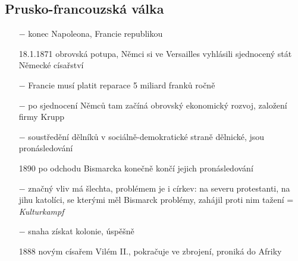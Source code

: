 \documentclass{article}
\begin{document}
\subsection*{Prusko-francouzská válka}
\begin{itemize}
    \vspace{-0.5em}
    \setlength\itemsep{0.15em}
    \item[$-$] konec Napoleona, Francie republikou
    \item[18.1.1871] obrovská potupa, Němci si ve Versailles vyhlásili sjednocený stát Německé císařství
    \item[$-$] Francie musí platit reparace 5 miliard franků ročně
\end{itemize}

\begin{itemize}
    \vspace{-0.5em}
    \setlength\itemsep{0.15em}
    \item[$-$] po sjednocení Němců tam začíná obrovský ekonomický rozvoj, založení firmy Krupp
    \item[$-$] soustředění dělníků v sociálně-demokratické straně dělnické, jsou pronásledování
    \item[1890] po odchodu Bismarcka konečně končí jejich pronásledování
    \item[$-$] značný vliv má šlechta, problémem je i církev: na severu protestanti, na jihu katolíci, se kterými měl Bismarck problémy, zahájil proti nim tažení = \textit{Kulturkampf}
    \item[$-$] snaha získat kolonie, úspěšně
    \item[1888] novým císařem Vilém II., pokračuje ve zbrojení, proniká do Afriky 
\end{itemize}
\end{document}
